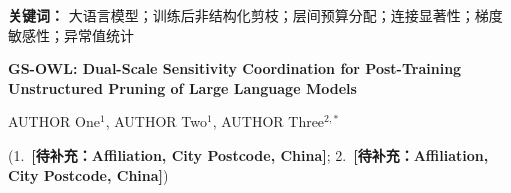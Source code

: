 \documentclass[UTF8,fontset=fandol]{ctexart}
\newcommand{\placeholder}[1]{\textbf{[待补充：#1]}}
\begin{document}
\noindent\textbf{关键词：}
大语言模型；训练后非结构化剪枝；层间预算分配；连接显著性；梯度敏感性；异常值统计

\vspace{8pt}
\begin{center}
{\bfseries{} GS-OWL: Dual-Scale Sensitivity Coordination for Post-Training Unstructured Pruning of Large Language Models\par}
\vspace{5pt}
{ AUTHOR One$^{1}$, AUTHOR Two$^{1}$, AUTHOR Three$^{2,*}$\par}
\vspace{3pt}
{
(1.\ \placeholder{Affiliation, City Postcode, China};
2.\ \placeholder{Affiliation, City Postcode, China})\par}
\end{center}
\end{document}
